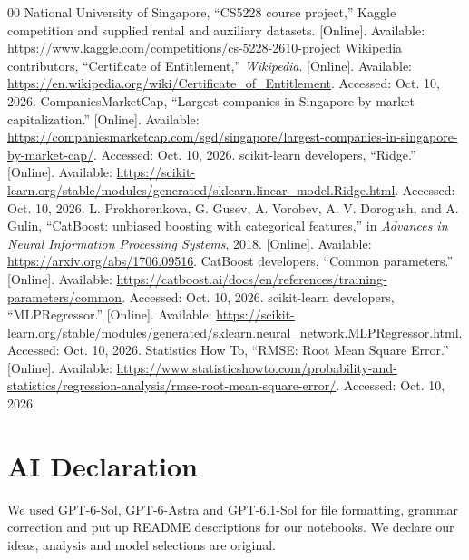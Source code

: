 \documentclass[conference]{IEEEtran}
\begin{document}
\clearpage
\begin{thebibliography}{00}
  National University of Singapore, ``CS5228 course project,'' Kaggle
  competition and supplied rental and auxiliary datasets. [Online].
  Available: \url{https://www.kaggle.com/competitions/cs-5228-2610-project}
  Wikipedia contributors, ``Certificate of Entitlement,'' \textit{Wikipedia}.
  [Online]. Available:
  \url{https://en.wikipedia.org/wiki/Certificate_of_Entitlement}.
  Accessed: Oct. 10, 2026.
  CompaniesMarketCap, ``Largest companies in Singapore by market
  capitalization.'' [Online]. Available:
  \url{https://companiesmarketcap.com/sgd/singapore/largest-companies-in-singapore-by-market-cap/}.
  Accessed: Oct. 10, 2026.
  scikit-learn developers, ``Ridge.'' [Online]. Available:
  \url{https://scikit-learn.org/stable/modules/generated/sklearn.linear_model.Ridge.html}.
  Accessed: Oct. 10, 2026.
  L. Prokhorenkova, G. Gusev, A. Vorobev, A. V. Dorogush, and A. Gulin,
  ``CatBoost: unbiased boosting with categorical features,''
  in \textit{Advances in Neural Information Processing Systems}, 2018.
  [Online]. Available: \url{https://arxiv.org/abs/1706.09516}.
  CatBoost developers, ``Common parameters.'' [Online]. Available:
  \url{https://catboost.ai/docs/en/references/training-parameters/common}.
  Accessed: Oct. 10, 2026.
  scikit-learn developers, ``MLPRegressor.'' [Online]. Available:
  \url{https://scikit-learn.org/stable/modules/generated/sklearn.neural_network.MLPRegressor.html}.
  Accessed: Oct. 10, 2026.
  Statistics How To, ``RMSE: Root Mean Square Error.'' [Online]. Available:
  \url{https://www.statisticshowto.com/probability-and-statistics/regression-analysis/rmse-root-mean-square-error/}.
  Accessed: Oct. 10, 2026.
\end{thebibliography}

\section*{AI Declaration}
We used GPT-6-Sol, GPT-6-Astra and GPT-6.1-Sol for file formatting, grammar
correction and put up README descriptions for our notebooks. We declare
our ideas, analysis and model selections are original.
\end{document}
